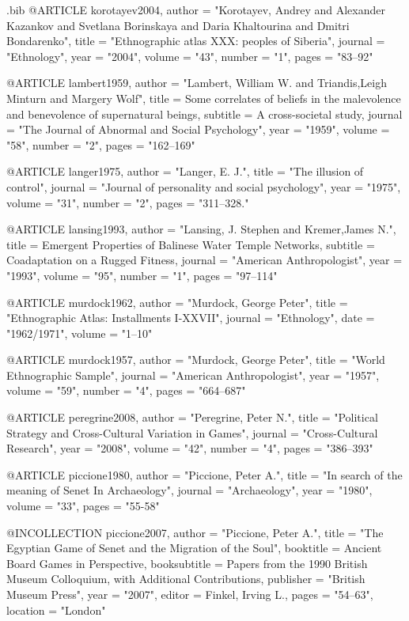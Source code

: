\begin{filecontents}{\IJSRAidentifier.bib}
@ARTICLE {korotayev2004,
	author  = "Korotayev, Andrey and Alexander Kazankov and Svetlana Borinskaya and Daria Khaltourina and Dmitri Bondarenko",
	title   = "Ethnographic atlas XXX: peoples of Siberia",
	journal = "Ethnology",
	year    = "2004",
	volume  = "43",
	number  = "1",
	pages   = "83--92"
}

@ARTICLE {lambert1959,
	author  = "Lambert, William W. and  Triandis,Leigh Minturn and Margery Wolf",
	title   = {Some correlates of beliefs in the malevolence and benevolence of supernatural beings},
	subtitle = {A cross-societal study},
	journal = "The Journal of Abnormal and Social Psychology",
	year    = "1959",
	volume  = "58",
	number  = "2",
	pages   = "162--169"
}

@ARTICLE {langer1975,
	author  = "Langer, E. J.",
	title   = "The illusion of control",
	journal = "Journal of personality and social psychology",
	year    = "1975",
	volume  = "31",
	number  = "2",
	pages   = "311--328."
}

@ARTICLE {lansing1993,
	author  = "Lansing, J. Stephen and Kremer,James N.",
	title   = {Emergent Properties of Balinese Water Temple Networks},
	subtitle = {Coadaptation on a Rugged Fitness},
	journal = "American Anthropologist",
	year    = "1993",
	volume  = "95",
	number  = "1",
	pages   = "97--114"
}

@ARTICLE {murdock1962,
	author  = "Murdock, George Peter",
	title   = "Ethnographic Atlas: Installments I-XXVII",
	journal = "Ethnology",
	date    = "1962/1971",
	volume  = "1--10"
}

@ARTICLE {murdock1957,
	author  = "Murdock, George Peter",
	title   = "World Ethnographic Sample",
	journal = "American Anthropologist",
	year    = "1957",
	volume  = "59",
	number  = "4",
	pages   = "664--687"
}

@ARTICLE {peregrine2008,
	author  = "Peregrine, Peter N.",
	title   = "Political Strategy and Cross-Cultural Variation in Games",
	journal = "Cross-Cultural Research",
	year    = "2008",
	volume  = "42",
	number  = "4",
	pages   = "386--393"
}

@ARTICLE {piccione1980,
	author  = "Piccione, Peter A.",
	title   = "In search of the meaning of Senet In Archaeology",
	journal = "Archaeology",
	year    = "1980",
	volume  = "33",
	pages   = "55-58"
}

@INCOLLECTION {piccione2007,
	author    = "Piccione, Peter A.",
	title     = "The Egyptian Game of Senet and the Migration of the Soul",
	booktitle = {Ancient Board Games in Perspective},
	booksubtitle = {Papers from the 1990 British Museum Colloquium, with Additional Contributions},
	publisher = "British Museum Press",
	year      = "2007",
	editor    = {Finkel, Irving L.},
	pages     = "54--63",
	location   = "London"
}


\end{filecontents}
